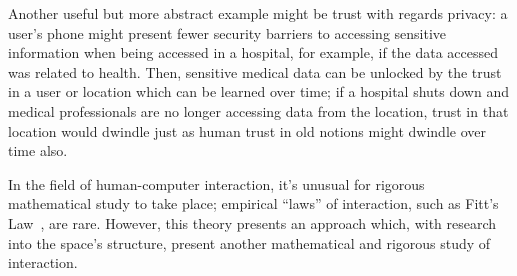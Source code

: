 Another useful but more abstract example might be trust with regards privacy: a user's phone might present fewer security barriers to accessing sensitive information when being accessed in a hospital, for example, if the data accessed was related to health. Then, sensitive medical data can be unlocked by the trust in a user or location which can be learned over time; if a hospital shuts down and medical professionals are no longer accessing data from the location, trust in that location would dwindle just as human trust in old notions might dwindle over time also.\par

In the field of human-computer interaction, it's unusual for rigorous mathematical study to take place; empirical ``laws'' of interaction, such as Fitt's Law~\citep{fitts1954information}, are rare. However, this theory presents an approach which, with research into the space's structure, present another mathematical and rigorous study of interaction.
